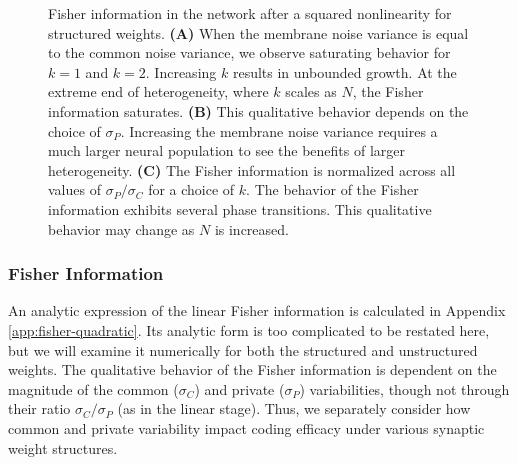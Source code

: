 \documentclass[12pt]{article}
\begin{document}
	\begin{figure}[t]
		\centering
		\caption{Fisher information in the network after a squared nonlinearity for structured weights. \textbf{(A)} When the membrane noise variance is equal to the common noise variance, we observe saturating behavior for $k=1$ and $k=2$. Increasing $k$ results in unbounded growth. At the extreme end of heterogeneity, where $k$ scales as $N$, the Fisher information saturates. \textbf{(B)} This qualitative behavior depends on the choice of $\sigma_P$. Increasing the membrane noise variance requires a much larger neural population to see the benefits of larger heterogeneity. \textbf{(C)} The Fisher information is normalized across all values of $\sigma_P/\sigma_C$ for a choice of $k$. The behavior of the Fisher information exhibits several phase transitions. This qualitative behavior may change as $N$ is increased.}
		\label{fig:fisher-quadratic}
	\end{figure}
	
	\subsubsection{Fisher Information}
	An analytic expression of the linear Fisher information is calculated in Appendix \ref{app:fisher-quadratic}. Its analytic form is too complicated to be restated here, but we will examine it numerically for both the structured and unstructured weights. The qualitative behavior of the Fisher information is dependent on the magnitude of the common ($\sigma_C$) and private ($\sigma_P$) variabilities, though not through their ratio $\sigma_C/\sigma_P$ (as in the linear stage). Thus, we separately consider how common and private variability impact coding efficacy under various synaptic weight structures.
	
\end{document}
